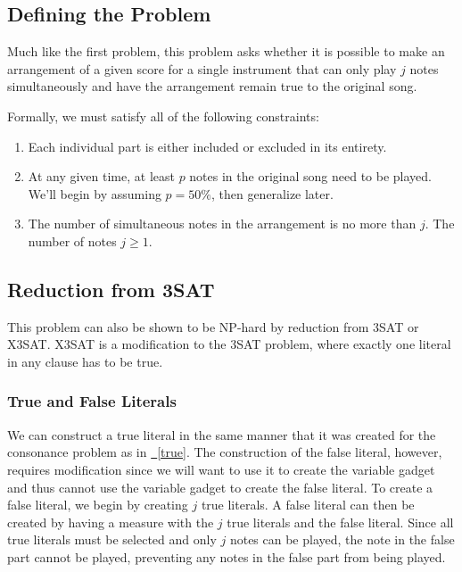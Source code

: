 \documentclass[11pt,letterpaper]{article}
\DeclarePairedDelimiter{\ceil}{\lceil}{\rceil}
\newcommand{\figref}[2][{}]{\hyperref[#2]{\figurename~\ref{#2}#1}}
\begin{document}
\subsection{Defining the Problem}
Much like the first problem, this problem asks whether it is possible to make an arrangement of a given score for a single instrument that can only play $j$ notes simultaneously and have the arrangement remain true to the original song.

Formally, we must satisfy all of the following constraints:
\begin{enumerate}
\item Each individual part is either included or excluded in its entirety.
\item At any given time, at least $p$ notes in the original song need to be played. We'll begin by assuming $p=50\%$, then generalize later.
\item The number of simultaneous notes in the arrangement is no more than $j$. The number of notes $j \ge 1$.
\end{enumerate}


\subsection{Reduction from 3SAT}
This problem can also be shown to be NP-hard by reduction from 3SAT or X3SAT. X3SAT is a modification to the 3SAT problem, where exactly one literal in any clause has to be true.

\subsubsection{True and False Literals}
We can construct a true literal in the same manner that it was created for the consonance problem as in \figref{true}. The construction of the false literal, however, requires modification since we will want to use it to create the variable gadget and thus cannot use the variable gadget to create the false literal. To create a false literal, we begin by creating $j$ true literals. A false literal can then be created by having a measure with the $j$ true literals and the false literal. Since all true literals must be selected and only $j$ notes can be played, the note in the false part cannot be played, preventing any notes in the false part from being played.
\end{document}
